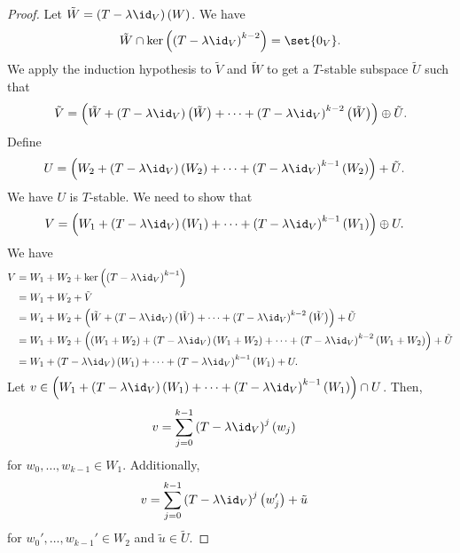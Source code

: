 \documentclass[10pt]{mypackage}
\begin{document}
\begin{proof}
  Let $\tilde{W} = \left(T-\lambda\id_V\right)(W)$. We have
  \begin{align*}
    \tilde{W} \cap \ker\left(\left(T-\lambda\id_V\right)^{k-2}\right) = \set{0_V}.
  \end{align*}
  We apply the induction hypothesis to $\tilde{V}$ and $\tilde{W}$ to get a $T$-stable subspace $\tilde{U}$ such that
  \begin{align*}
    \tilde{V} = \left(\tilde{W} + \left(T - \lambda\id_V\right)\left(\tilde{W}\right) + \cdots + \left(T-\lambda\id_V\right)^{k-2}\left(\tilde{W}\right)\right) \oplus \tilde{U}.
  \end{align*}
  Define
  \begin{align*}
    U &= \left(W_2 + \left(T-\lambda\id_V\right)\left(W_2\right) + \cdots + \left(T-\lambda\id_V\right)^{k-1}\left(W_2\right)\right) + \tilde{U}.
  \end{align*}
  We have $U$ is $T$-stable. We need to show that
  \begin{align*}
    V &= \left(W_1 + \left(T-\lambda\id_V\right)\left(W_1\right) + \cdots + \left(T-\lambda\id_V\right)^{k-1}\left(W_1\right)\right)\oplus U.
  \end{align*}
  We have
  \begin{align*}
    V &= W_1 + W_2 + \ker\left(\left(T-\lambda\id_V\right)^{k-1}\right)\\
      &= W_1 + W_2 + \tilde{V}\\
      &= W_1 + W_2 + \left(\tilde{W} + \left(T - \lambda\id_V\right)\left(\tilde{W}\right) + \cdots + \left(T-\lambda\id_V\right)^{k-2}\left(\tilde{W}\right)\right) + \tilde{U}\\
      &= W_1 + W_2 + \left(\left(W_1 + W_2\right) + \left(T - \lambda\id_V\right)\left(W_1 + W_2\right) + \cdots + \left(T-\lambda\id_V\right)^{k-2}\left(W_1 + W_2\right)\right) + \tilde{U}\\
      &= W_1 + \left(T-\lambda\id_V\right)\left(W_1\right) + \cdots + \left(T-\lambda\id_V\right)^{k-1}\left(W_1\right) + U.
  \end{align*}
  Let $v\in \left(W_1 + \left(T-\lambda\id_V\right)\left(W_1\right) + \cdots + \left(T-\lambda\id_V\right)^{k-1}\left(W_1\right)\right)\cap U$. Then,
  \begin{align*}
    v &= \sum_{j=0}^{k-1}\left(T-\lambda\id_V\right)^j\left(w_j\right)
  \end{align*}
  for $w_0,\dots,w_{k-1}\in W_1$. Additionally,
  \begin{align*}
    v &= \sum_{j=0}^{k-1}\left(T-\lambda\id_V\right)^{j}\left(w_j'\right) + \tilde{u}
  \end{align*}
  for $w_0',\dots,w_{k-1}'\in W_2$ and $\tilde{u}\in \tilde{U}$.\newline


\end{proof}
\end{document}
